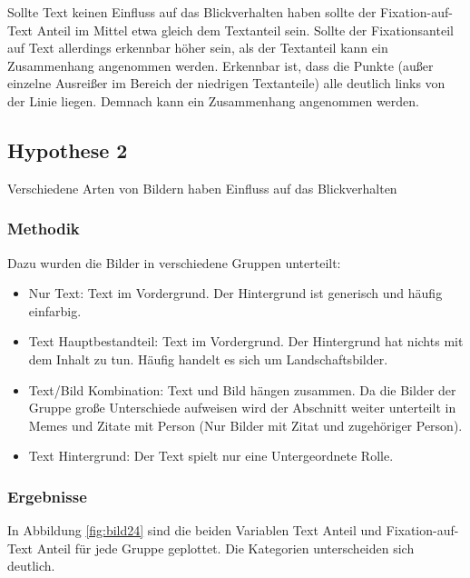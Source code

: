 \documentclass[
    language=german, %
    thesis=seminar, %
    supervisor=postdoc, %
    multiauthor=true, %
    ]{settings/csssa-thesis}
\begin{document}
Sollte Text keinen Einfluss auf das Blickverhalten haben sollte der Fixation-auf-Text Anteil im Mittel 
etwa gleich dem Textanteil sein. Sollte der Fixationsanteil auf Text allerdings erkennbar höher sein, 
als der Textanteil kann ein Zusammenhang angenommen werden.
Erkennbar ist, dass die Punkte (außer einzelne Ausreißer im Bereich der niedrigen Textanteile) 
alle deutlich links von der Linie liegen. Demnach kann ein Zusammenhang angenommen werden.

\subsection{Hypothese 2}
Verschiedene Arten von Bildern haben Einfluss auf das Blickverhalten

\subsubsection{Methodik}
Dazu wurden die Bilder in verschiedene Gruppen unterteilt:
\begin{itemize}
    \item Nur Text: Text im Vordergrund. Der Hintergrund ist generisch und häufig einfarbig. 
    \item Text Hauptbestandteil: Text im Vordergrund. Der Hintergrund hat nichts mit dem Inhalt zu tun. Häufig handelt es sich um Landschaftsbilder. 
    \item Text/Bild Kombination: Text und Bild hängen zusammen. Da die Bilder der Gruppe große Unterschiede aufweisen wird der Abschnitt weiter unterteilt in Memes und Zitate mit Person (Nur Bilder mit Zitat und zugehöriger Person).
    \item Text Hintergrund: Der Text spielt nur eine Untergeordnete Rolle. 
\end{itemize}

\subsubsection{Ergebnisse}
In Abbildung \ref{fig:bild24} sind die beiden Variablen Text Anteil und Fixation-auf-Text Anteil für jede Gruppe geplottet. 
Die Kategorien unterscheiden sich deutlich.
\end{document}
